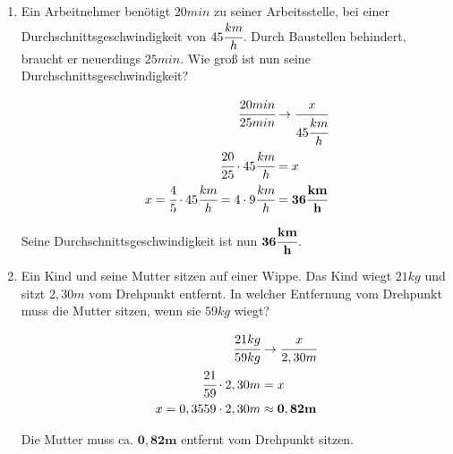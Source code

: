 \documentclass[a4paper,10pt]{article} %
\begin{document}
\begin{enumerate}
    Mit 56 Zeilen auf jeder Seite könnte der Umfang auf \textbf{360 Seiten} verringert werden.

  \item Ein Arbeitnehmer benötigt \(20 min\) zu seiner Arbeitsstelle, bei einer
    Durchschnittsgeschwindigkeit von \(45 \cfrac{km}{h}\). Durch Baustellen behindert,
    braucht er neuerdings \(25 min\). Wie groß ist nun seine Durchschnittsgeschwindigkeit?

    \[
      \begin{aligned}
        \cfrac{20 min}{25 min} &\rightarrow \cfrac{x}{45 \cfrac{km}{h}} \\
        \cfrac{20}{25} \cdot 45 \cfrac{km}{h} &= x \\
        x = \cfrac{4}{5} \cdot 45 \cfrac{km}{h} = 4 \cdot 9 \cfrac{km}{h} &= \mathbf{36 \cfrac{km}{h}}
      \end{aligned}
    \]

    Seine Durchschnittsgeschwindigkeit ist nun \(\mathbf{36 \cfrac{km}{h}}\).

  \item Ein Kind und seine Mutter sitzen auf einer Wippe. Das Kind wiegt \(21 kg\)
    und sitzt \(2,30 m\) vom Drehpunkt entfernt. In welcher Entfernung vom Drehpunkt
    muss die Mutter sitzen, wenn sie \(59 kg\) wiegt?

    \[
      \begin{aligned}
        \cfrac{21 kg}{59 kg} &\rightarrow \cfrac{x}{2,30 m} \\
        \cfrac{21}{59} \cdot 2,30 m &= x \\
        x = 0,3559 \cdot 2,30 m &\approx \mathbf{0,82 m}
      \end{aligned}
    \]

    Die Mutter muss ca. \(\mathbf{0,82 m}\) entfernt vom Drehpunkt sitzen.

\end{enumerate}
\end{document}
